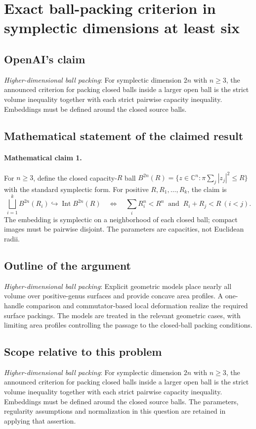 \documentclass[11pt]{article}
\begin{document}
\section*{Exact ball-packing criterion in symplectic dimensions at least six}

\subsection{OpenAI's claim}
\textit{Higher-dimensional ball packing}: For symplectic dimension $2n$ with $n\ge3$, the announced criterion for packing closed balls inside a larger open ball is the strict volume inequality together with each strict pairwise capacity inequality. Embeddings must be defined around the closed source balls.

\subsection{Mathematical statement of the claimed result}
\paragraph{Mathematical claim 1.} For $n\ge3$, define the closed capacity-$R$ ball $B^{2n}(R)=\{z\in\mathbb C^n:\pi\sum_j|z_j|^2\le R\}$ with the standard symplectic form. For positive $R,R_1,\ldots,R_k$, the claim is \[\bigsqcup_{i=1}^k B^{2n}(R_i)\hookrightarrow\operatorname{Int}B^{2n}(R)\quad\Longleftrightarrow\quad\sum_iR_i^n<R^n\ \text{ and }\ R_i+R_j<R\ (i<j).\] The embedding is symplectic on a neighborhood of each closed ball; compact images must be pairwise disjoint. The parameters are capacities, not Euclidean radii.

\subsection{Outline of the argument}
\textit{Higher-dimensional ball packing}: Explicit geometric models place nearly all volume over positive-genus surfaces and provide concave area profiles. A one-handle comparison and commutator-based local deformation realize the required surface packings. The models are treated in the relevant geometric cases, with limiting area profiles controlling the passage to the closed-ball packing conditions.

\subsection{Scope relative to this problem}
\textit{Higher-dimensional ball packing}: For symplectic dimension $2n$ with $n\ge3$, the announced criterion for packing closed balls inside a larger open ball is the strict volume inequality together with each strict pairwise capacity inequality. Embeddings must be defined around the closed source balls. The parameters, regularity assumptions and normalization in this question are retained in applying that assertion.
\end{document}
